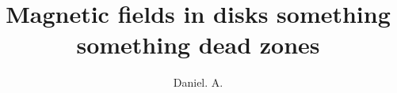 \documentclass[defaultstyle,11pt]{thesis}
\title{Magnetic fields in disks something something dead zones}
\author{Daniel. A.}{Gole}
\begin{document}








\nocite{*}		%

\appendix

%
\end{document}
